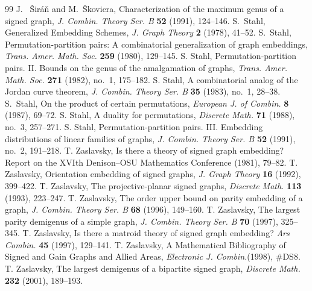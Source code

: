 \documentclass[10pt,a4paper]{amsart}
\begin{document}
\begin{thebibliography}{99}
 J. ~\v{S}ir\'a\v{n} and M.~\v{S}koviera, Characterization of the maximum genus of a signed graph, \emph{J. Combin. Theory Ser. B} \textbf{52} (1991), 124--146.
 S.~Stahl, Generalized Embedding Schemes, \emph{J. Graph Theory} \textbf{2} (1978), 41--52.
 S.~Stahl, Permutation-partition pairs: A combinatorial generalization of graph embeddings, \emph{Trans. Amer. Math. Soc.} \textbf{259} (1980), 129--145.
 S. Stahl, Permutation-partition pairs. II. Bounds on the genus of the amalgamation of graphs, \emph{Trans. Amer. Math. Soc.} {\bf 271} (1982), no.~1, 175--182.
 S. Stahl, A combinatorial analog of the Jordan curve theorem, \emph{J. Combin. Theory Ser. B} {\bf 35} (1983), no.~1, 28--38.
 S.~Stahl, On the product of certain permutations, \emph{European J. of Combin.} \textbf{8} (1987), 69--72.
 S. Stahl, A duality for permutations,\emph{ Discrete Math.} {\bf 71} (1988), no.~3, 257--271.
 S. Stahl, Permutation-partition pairs. III. Embedding distributions of linear families of graphs, \emph{J. Combin. Theory Ser. B} {\bf 52} (1991), no.~2, 191--218.
 T. Zaslavsky, Is there a theory of signed graph embedding? Report on the XVIth Denison--OSU Mathematics Conference (1981), 79--82.
 T. Zaslavsky, Orientation embedding of signed graphs, \emph{J. Graph Theory} \textbf{16} (1992), 399--422.
 T. Zaslavsky, The projective-planar signed graphs, \emph{Discrete Math.} \textbf{113} (1993), 223--247.
 T. Zaslavsky, The order upper bound on parity embedding of a graph, \emph{J. Combin. Theory Ser. B} \textbf{68} (1996), 149--160.
 T. Zaslavsky, The largest parity demigenus of a simple graph, \emph{J. Combin. Theory Ser. B} \textbf{70} (1997), 325--345.
 T. Zaslavsky, Is there a matroid theory of signed graph embedding? \emph{Ars Combin.} {\bf 45} (1997), 129--141.
 T. Zaslavsky, A Mathematical Bibliography of Signed and Gain Graphs and Allied Areas, \emph{Electronic J. Combin.}(1998), \#DS8.
 T. Zaslavsky, The largest demigenus of a bipartite signed graph, \emph{Discrete Math.} \textbf{232} (2001), 189--193.
\end{thebibliography}
\end{document}

